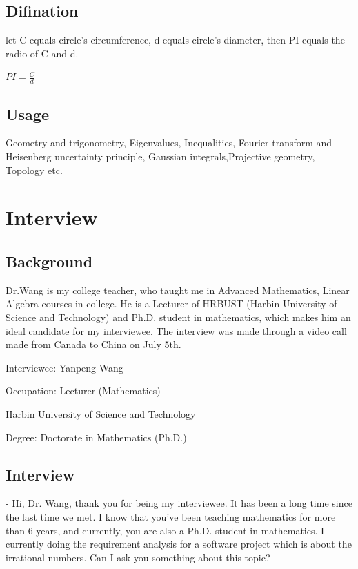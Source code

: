 \documentclass[12pt]{report}
\begin{document}
{	
	\section{Difination}
	let C equals circle's circumference, d equals circle's diameter, then PI equals the radio of C and d.
	
	
	\begin{center}
		$PI=\frac{C}{d}$
	\end{center}
	
	\section{Usage} 
	Geometry and trigonometry, Eigenvalues, Inequalities, Fourier transform and Heisenberg uncertainty principle, Gaussian integrals,Projective geometry, Topology etc.
	

\chapter{Interview}
\section{Background}

Dr.Wang is my college teacher, who taught me in Advanced Mathematics, Linear Algebra courses in college. He is a Lecturer of HRBUST (Harbin University of Science and Technology) and Ph.D. student in mathematics, which makes him an ideal candidate for my interviewee.
The interview was made through a video call made from Canada to China on July 5th. 


Interviewee: Yanpeng Wang

Occupation: Lecturer (Mathematics)

Harbin University of Science and Technology

Degree: Doctorate in Mathematics (Ph.D.)


\section{Interview}

- Hi, Dr. Wang, thank you for being my interviewee.  It has been a long time since the last time we met. I know that you've been teaching mathematics for more than 6 years, and currently, you are also a Ph.D. student in mathematics. I currently doing the requirement analysis for a software project which is about the irrational numbers. Can I ask you something about this topic?

}
\end{document}
